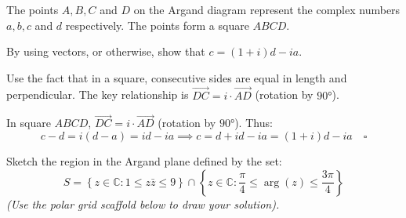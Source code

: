 \begin{problem}
The points $A, B, C$ and $D$ on the Argand diagram represent the complex numbers $a, b, c$ and $d$ respectively. The points form a square $ABCD$.

By using vectors, or otherwise, show that $c = (1 + i)d - ia$.
\end{problem}

\begin{hint}
Use the fact that in a square, consecutive sides are equal in length and perpendicular. The key relationship is $\overrightarrow{DC} = i \cdot \overrightarrow{AD}$ (rotation by $90°$).
\end{hint}

\begin{solution}[Proof]
In square $ABCD$, $\overrightarrow{DC} = i \cdot \overrightarrow{AD}$ (rotation by $90°$). Thus:
\[
c-d = i(d-a) = id-ia \implies c = d+id-ia = (1+i)d-ia \quad \square
\]
\end{solution}


\begin{problem}
Sketch the region in the Argand plane defined by the set:
$$S = \left\{ z \in \mathbb{C} : 1 \le z\bar{z} \le 9 \right\} \cap \left\{ z \in \mathbb{C} : \frac{\pi}{4} \le \arg(z) \le \frac{3\pi}{4} \right\}$$
\textit{(Use the polar grid scaffold below to draw your solution).}

\vspace{0.5cm}
\begin{center}
\end{center}
\end{problem}

